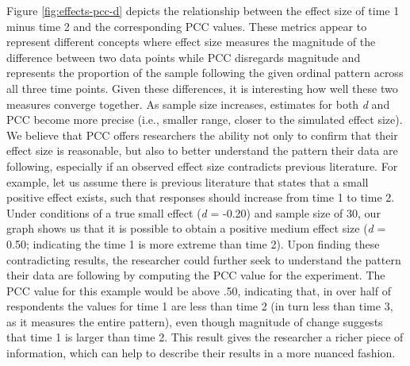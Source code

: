 \documentclass[,man, mask]{apa6}
\begin{document}
Figure \ref{fig:effects-pcc-d} depicts the relationship between the effect size of time 1 minus time 2 and the corresponding PCC values. These metrics appear to represent different concepts where effect size measures the magnitude of the difference between two data points while PCC disregards magnitude and represents the proportion of the sample following the given ordinal pattern across all three time points. Given these differences, it is interesting how well these two measures converge together. As sample size increases, estimates for both \emph{d} and PCC become more precise (i.e., smaller range, closer to the simulated effect size). We believe that PCC offers researchers the ability not only to confirm that their effect size is reasonable, but also to better understand the pattern their data are following, especially if an observed effect size contradicts previous literature. For example, let us assume there is previous literature that states that a small positive effect exists, such that responses should increase from time 1 to time 2. Under conditions of a true small effect (\emph{d} = -0.20) and sample size of 30, our graph shows us that it is possible to obtain a positive medium effect size (\emph{d} = 0.50; indicating the time 1 is more extreme than time 2). Upon finding these contradicting results, the researcher could further seek to understand the pattern their data are following by computing the PCC value for the experiment. The PCC value for this example would be above .50, indicating that, in over half of respondents the values for time 1 are less than time 2 (in turn less than time 3, as it measures the entire pattern), even though magnitude of change suggests that time 1 is larger than time 2. This result gives the researcher a richer piece of information, which can help to describe their results in a more nuanced fashion.
\end{document}
